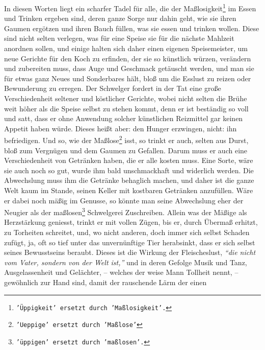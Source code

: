 \medskip

In diesen Worten liegt ein scharfer Tadel für alle, die der
Maßlosigkeit\footnote{\texttt{'Üppigkeit' ersetzt durch 'Maßlosigkeit'.}} im Essen
und Trinken ergeben sind, deren ganze Sorge nur dahin geht, wie sie ihren
Gaumen ergötzen und ihren Bauch füllen, was sie essen und trinken wollen. Diese
sind nicht selten verlegen, was für eine Speise sie für die nächste Mahlzeit
anordnen sollen, und einige halten sich daher einen eigenen
Speisemeister, um
neue Gerichte für den Koch zu erfinden,
der sie so künstlich würzen, verändern
und zubereiten muss, dass Auge und Geschmack getäuscht werden, und man sie für
etwas ganz Neues und Sonderbares hält, bloß um die Esslust zu reizen oder
Bewunderung zu erregen. Der Schwelger fordert in der
Tat eine große
Verschiedenheit seltener und köstlicher Gerichte, wobei nicht selten die Brühe
weit höher als die Speise selbst zu stehen kommt, denn er ist beständig so voll
und satt, dass er ohne Anwendung solcher künstlichen
Reizmittel gar keinen
Appetit haben würde. Dieses heißt aber: den Hunger erzwingen, nicht: ihn
befriedigen. Und so, wie der Maßlose\footnote{\texttt{'Ueppige' ersetzt durch
'Maßlose'}} isst,
so trinkt er auch, selten aus Durst,
bloß zum Vergnügen und dem Gaumen zu Gefallen. Darum muss er
auch eine
Verschiedenheit von Getränken haben, die er alle kosten
muss. Eine Sorte, wäre
sie auch noch so gut, wurde ihm bald unschmackhaft und widerlich werden. Die
Abwechslung muss ihm die Getränke behaglich machen, und daher ist die ganze Welt
kaum im Stande, seinen Keller mit kostbaren Getränken anzufüllen. Wäre er dabei
noch mäßig im Genusse, so könnte man seine Abwechslung eher der Neugier als der
maßlosen\footnote{\texttt{'üppigen' ersetzt durch 'maßlosen'.}} Schwelgerei
Zuschreiben. Allein was
der Mäßige als Herzstärkung
geniesst, trinkt er mit vollen Zügen, bis er, durch
Übermaß erhitzt, zu
Torheiten schreitet, und, wo nicht anderen, doch immer sich selbst Schaden
zufügt, ja, oft so tief unter das unvernünftige Tier herabsinkt, dass er sich
selbst seines Bewusstseins beraubt. Dieses ist die Wirkung der Fleischeslust,
\textit{"`die nicht vom Vater, sondern von der Welt ist,"'} und in deren Gefolge
Musik
und Tanz, Ausgelassenheit und Gelächter, -- welches der weise Mann
Tollheit
nennt, -- gewöhnlich zur Hand sind, damit der rauschende Lärm der einen
